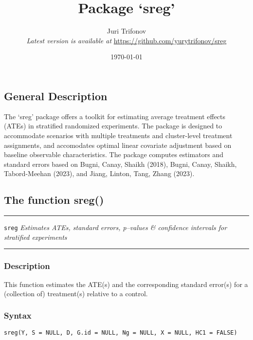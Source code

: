 \documentclass{article}
\title{\textbf{Package `sreg'}}
\author{Juri Trifonov \\ \textit{Latest version is available at} \href{https://github.com/yurytrifonov/sreg}{https://github.com/yurytrifonov/sreg}
}
\date{\today}
\newenvironment{cranfunction}[2]{%
    \textcolor{linecolor}{\rule{\linewidth}{0.4pt}}\par\vspace*{\fill}
    \texttt{#1} \hfill #2\par\nobreak\noindent
    \textcolor{linecolor}{\rule{\linewidth}{0.4pt}}\vspace*{\fill}\par
}{%

}
\begin{document}
\maketitle

\subsection*{General Description}
The `sreg' package offers a toolkit for estimating average treatment effects (ATEs) in stratified randomized experiments. The package is designed to accommodate scenarios with multiple treatments and cluster-level treatment assignments, and accomodates optimal linear covariate adjustment based on baseline observable characteristics. The package computes estimators and standard errors based on Bugni, Canay, Shaikh (2018), Bugni, Canay, Shaikh, Tabord-Meehan (2023), and Jiang, Linton, Tang, Zhang (2023).

\subsection*{The function sreg()}

\begin{cranfunction}{sreg}{\textit{Estimates ATEs, standard errors, p--values \& confidence intervals for stratified experiments}}
\end{cranfunction}
\subsubsection*{Description}
This function estimates the ATE(s) and the corresponding standard error(s) for a (collection of) treatment(s) relative to a control.
\subsubsection*{Syntax}
\texttt{sreg(Y, S = NULL, D, G.id = NULL, Ng = NULL, X = NULL, HC1 = FALSE)}
\end{document}
